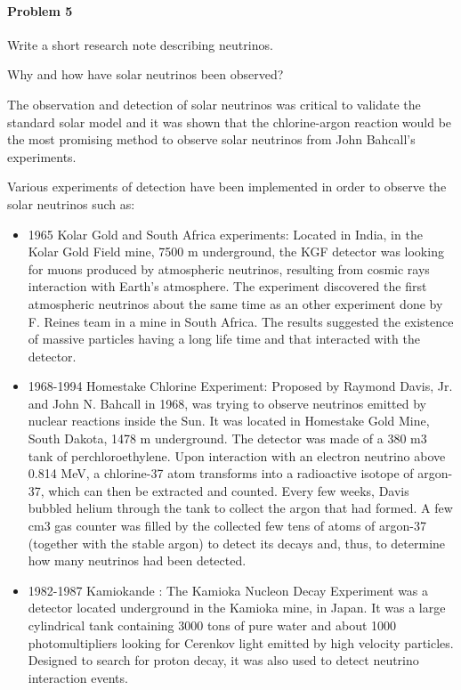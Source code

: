 \documentclass[11pt]{scrartcl}
\newcommand{\SubItem}[1]{
    {\setlength\itemindent{15pt} \item[-] #1}
}
\begin{document}
{\paragraph*{Problem 5}
Write a short research note describing neutrinos.


\begin{itemize}
    \item  Why and how have solar neutrinos been observed?
    \SubItem {The observation and detection of solar neutrinos was critical to validate the standard solar model and it was shown that the chlorine-argon reaction would be the most promising method to observe solar neutrinos from John Bahcall's experiments.}
    \SubItem{Various experiments of detection have been implemented in order to observe the solar neutrinos such as\cite{web2}:
    \begin{itemize}[noitemsep,nolistsep]
    \item 1965 Kolar Gold and South Africa experiments: Located in India, in the Kolar Gold Field mine, 7500 m underground, the KGF detector was looking for muons produced by atmospheric neutrinos, resulting from cosmic rays interaction with Earth’s atmosphere. The experiment discovered the first atmospheric neutrinos about the same time as an other experiment done by F. Reines team in a mine in South Africa. The results suggested the existence of massive particles having a long life time and that interacted with the detector.
    \item 1968-1994 Homestake Chlorine Experiment: Proposed by Raymond Davis, Jr. and John N. Bahcall in 1968, was trying to observe neutrinos emitted by nuclear reactions inside the Sun. It was located in Homestake Gold Mine, South Dakota, 1478 m underground. The detector was made of a 380 m3 tank of perchloroethylene. Upon interaction with an electron neutrino above 0.814 MeV, a chlorine-37 atom transforms into a radioactive isotope of argon-37, which can then be extracted and counted. Every few weeks, Davis bubbled helium through the tank to collect the argon that had formed. A few cm3 gas counter was filled by the collected few tens of atoms of argon-37 (together with the stable argon) to detect its decays and, thus, to determine how many neutrinos had been detected. 
    \item 1982-1987 Kamiokande : The Kamioka Nucleon Decay Experiment was a detector located underground in the Kamioka mine, in Japan. It was a large cylindrical tank containing 3000 tons of pure water and about 1000 photomultipliers looking for Cerenkov light emitted by high velocity particles. Designed to search for proton decay, it was also used to detect neutrino interaction events.

\end{itemize}}
\end{itemize}}
\end{document}
